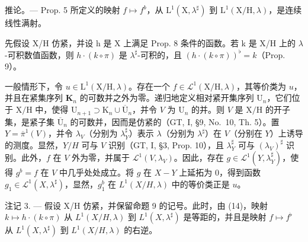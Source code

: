 推论。--- Prop. 5 所定义的映射 \(f \mapsto f^{b}\)，从 \(\mathrm{L}^{1}(\mathrm{X}, \lambda^{\sharp})\) 到 \(\mathrm{L}^{1}(\mathrm{X}/\mathrm{H}, \lambda)\)，是连续线性满射。

先假设 X/H 仿紧，并设 h 是 X 上满足 Prop. 8 条件的函数。若 k 是 X/H 上的 \(\lambda\)-可积数值函数，则 \(h \cdot (k \circ \pi)\) 是 \(\lambda^{\sharp}\)-可积的，且 \((h \cdot (k \circ \pi))^{\flat} = k\)（Prop. 9）。

一般情形下，令 \(u \in \mathrm{L}^1(\mathrm{X/H},\lambda)\)。存在一个 \(f \in \mathcal{L}^1(\mathrm{X/H},\lambda)\)，其等价类为 \(u\)，并且在紧集序列 \(\mathbf{K}_n\) 的可数并之外为零。递归地定义相对紧开集序列 \(\mathrm{U}_n\)，它们位于 \(\mathrm{X/H}\) 中，使得 \(\mathrm{U}_{n+1} \supset \mathrm{K}_n \cup \overline{\mathrm{U}}_n\)，并令 \(V\) 为 \(\mathrm{U}_n\) 的并。则 \(V\) 是 \(\mathrm{X/H}\) 的开子集，是紧子集 \(\overline{\mathrm{U}}_n\) 的可数并，因而是仿紧的（GT, I, §9, No.~10, Th. 5）。置 \(Y = \overline{\pi}^1(V)\)，并令 \(\lambda_V\)（分别为 \(\lambda_Y^\sharp\)）表示 \(\lambda\)（分别为 \(\lambda^\sharp\)）在 \(V\)（分别在 \(Y\)）上诱导的测度。显然，\(Y/H\) 可与 \(V\) 识别（GT, I, §3, Prop. 10），且 \(\lambda_Y^\sharp\) 可与 \((\lambda_V)^{\sharp}\) 识别。此外，\(f\) 在 \(V\) 外为零，并属于 \(\mathcal{L}^1(V,\lambda_V)\)。因此，存在 \(g \in \mathcal{L}^1(Y,\lambda_Y^\sharp)\)，使得 \(g^b = f\) 在 \(V\) 中几乎处处成立。将 \(g\) 在 \(X - Y\) 上延拓为 0，得到函数 \(g_1 \in \mathcal{L}^1(X,\lambda^\sharp)\)，显然，\(g_1^b\) 在 \(L^1(X/H,\lambda)\) 中的等价类正是 \(u\)。

注记 3. --- 假设 X/H 仿紧，并保留命题 9 的记号。此时，由 (14)，映射 \(k \mapsto h \cdot (k \circ \pi)\) 从 \(L^1(X/H, \lambda)\) 到 \(L^1(X, \lambda^\sharp)\) 是等距的，并且是映射 \(f \mapsto f^\flat\) 从 \(L^1(X, \lambda^\sharp)\) 到 \(L^1(X/H, \lambda)\) 的右逆。

